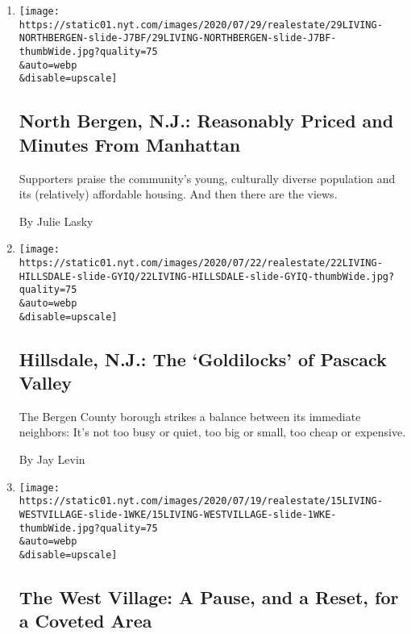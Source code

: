 \begin{enumerate}
\def\labelenumi{\arabic{enumi}.}
\item
  \href{/2020/07/29/realestate/north-bergen-nj-reasonably-priced-and-minutes-from-manhattan.html}{}

  \texttt{[image: https://static01.nyt.com/images/2020/07/29/realestate/29LIVING-NORTHBERGEN-slide-J7BF/29LIVING-NORTHBERGEN-slide-J7BF-thumbWide.jpg?quality=75\\\&auto=webp\\\&disable=upscale]}

  \hypertarget{north-bergen-nj-reasonably-priced-and-minutes-from-manhattan}{%
  \subsection{North Bergen, N.J.: Reasonably Priced and Minutes From
  Manhattan}\label{north-bergen-nj-reasonably-priced-and-minutes-from-manhattan}}

  Supporters praise the community's young, culturally diverse population
  and its (relatively) affordable housing. And then there are the views.

  By Julie Lasky
\item
  \href{/2020/07/22/realestate/hillsdale-nj-pascack-valley.html}{}

  \texttt{[image: https://static01.nyt.com/images/2020/07/22/realestate/22LIVING-HILLSDALE-slide-GYIQ/22LIVING-HILLSDALE-slide-GYIQ-thumbWide.jpg?quality=75\\\&auto=webp\\\&disable=upscale]}

  \hypertarget{hillsdale-nj-the-goldilocks-of-pascack-valley}{%
  \subsection{Hillsdale, N.J.: The `Goldilocks' of Pascack
  Valley}\label{hillsdale-nj-the-goldilocks-of-pascack-valley}}

  The Bergen County borough strikes a balance between its immediate
  neighbors: It's not too busy or quiet, too big or small, too cheap or
  expensive.

  By Jay Levin
\item
  \href{/2020/07/15/realestate/west-village-nyc.html}{}

  \texttt{[image: https://static01.nyt.com/images/2020/07/19/realestate/15LIVING-WESTVILLAGE-slide-1WKE/15LIVING-WESTVILLAGE-slide-1WKE-thumbWide.jpg?quality=75\\\&auto=webp\\\&disable=upscale]}

  \hypertarget{the-west-village-a-pause-and-a-reset-for-a-coveted-area}{%
  \subsection{The West Village: A Pause, and a Reset, for a Coveted
  Area}\label{the-west-village-a-pause-and-a-reset-for-a-coveted-area}}


\end{enumerate}

